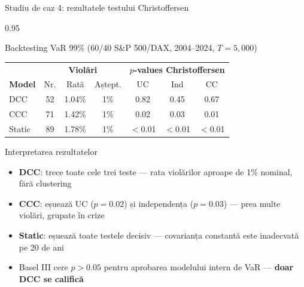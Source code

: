 \documentclass[9pt, aspectratio=169, t]{beamer}
\begin{document}
\begin{frame}{Studiu de caz 4: rezultatele testului Christoffersen}
    \begin{cminipage}{0.95\textwidth}
    {\footnotesize
    \begin{block}{Backtesting VaR 99\% (60/40 S\&P 500/DAX, 2004--2024, $T = 5{,}000$)}
        \vspace{0.1cm}
        {\small
        \begin{center}
        \begin{tabular}{l|ccc|ccc}
            \hline
            & \multicolumn{3}{c|}{\textbf{Violări}} & \multicolumn{3}{c}{\textbf{$p$-values Christoffersen}} \\
            \textbf{Model} & Nr. & Rată & Aștept. & UC & Ind & CC \\
            \hline
            DCC    & 52 & 1.04\% & 1\% & 0.82 & 0.45 & 0.67 \\
            CCC    & 71 & 1.42\% & 1\% & 0.02 & 0.03 & 0.01 \\
            Static & 89 & 1.78\% & 1\% & $<$0.01 & $<$0.01 & $<$0.01 \\
            \hline
        \end{tabular}
        \end{center}
        }
    \end{block}
    \begin{alertblock}{Interpretarea rezultatelor}
        \begin{itemize}\setlength{\itemsep}{0pt}
            \item \textbf{DCC}: trece toate cele trei teste --- rata violărilor aproape de 1\% nominal, fără clustering
            \item \textbf{CCC}: eșuează UC ($p = 0.02$) și independența ($p = 0.03$) --- prea multe violări, grupate în crize
            \item \textbf{Static}: eșuează toate testele decisiv --- covarianța constantă este inadecvată pe 20 de ani
            \item Basel III cere $p > 0.05$ pentru aprobarea modelului intern de VaR --- \textbf{doar DCC se califică}
        \end{itemize}
    \end{alertblock}
    }
    \end{cminipage}
\end{frame}
\end{document}
